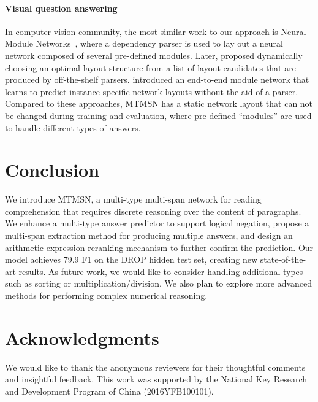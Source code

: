 \documentclass[11pt,a4paper]{article}
\begin{document}
\paragraph{Visual question answering}
In computer vision community, the most similar work to our approach is Neural Module Networks~\cite{andreas2016neural}, where a dependency parser is used to lay out a neural network composed of several pre-defined modules.
Later, \citet{andreas2016learning} proposed dynamically choosing an optimal layout structure from a list of layout candidates that are produced by off-the-shelf parsers.
\citet{hu2017learning} introduced an end-to-end module network that learns to predict instance-specific network layouts without the aid of a parser.
Compared to these approaches, MTMSN has a static network layout that can not be changed during training and evaluation, where pre-defined ``modules'' are used to handle different types of answers. 
 \section{Conclusion}
We introduce MTMSN, a multi-type multi-span network for reading comprehension that requires discrete reasoning over the content of paragraphs.
We enhance a multi-type answer predictor to support logical negation, propose a multi-span extraction method for producing multiple answers, and design an arithmetic expression reranking mechanism to further confirm the prediction.
Our model achieves 79.9 F1 on the DROP hidden test set, creating new state-of-the-art results.
As future work, we would like to consider handling additional types such as sorting or multiplication/division.
We also plan to explore more advanced methods for performing complex numerical reasoning.


 \section*{Acknowledgments}
 We would like to thank the anonymous reviewers for their thoughtful comments and insightful feedback.
 This work was supported by the National Key Research and Development Program of China (2016YFB100101).
  



\appendix
\end{document}
